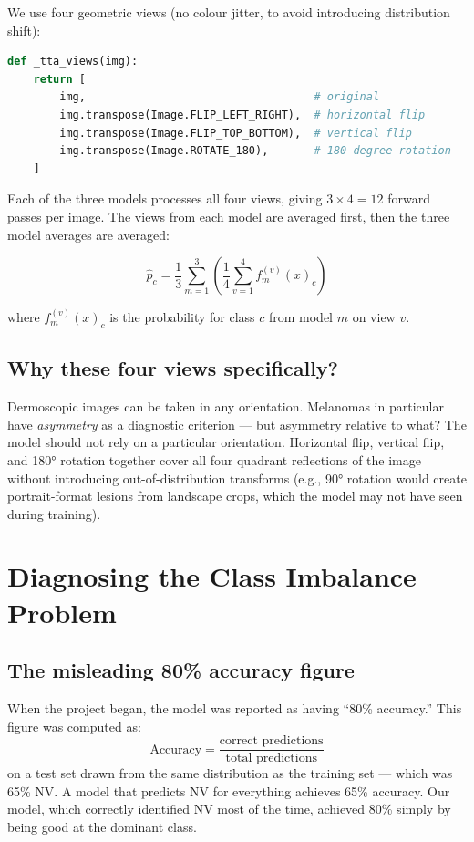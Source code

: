 \documentclass[12pt,a4paper]{article}
\begin{document}
We use four geometric views (no colour jitter, to avoid introducing distribution shift):

\begin{lstlisting}[language=Python]
def _tta_views(img):
    return [
        img,                                   # original
        img.transpose(Image.FLIP_LEFT_RIGHT),  # horizontal flip
        img.transpose(Image.FLIP_TOP_BOTTOM),  # vertical flip
        img.transpose(Image.ROTATE_180),       # 180-degree rotation
    ]
\end{lstlisting}

Each of the three models processes all four views, giving $3 \times 4 = 12$ forward passes
per image. The views from each model are averaged first, then the three model averages are
averaged:

\[
\hat{p}_c = \frac{1}{3} \sum_{m=1}^{3} \left( \frac{1}{4} \sum_{v=1}^{4} f_m^{(v)}(x)_c \right)
\]

where $f_m^{(v)}(x)_c$ is the probability for class $c$ from model $m$ on view $v$.

\subsection{Why these four views specifically?}

Dermoscopic images can be taken in any orientation. Melanomas in particular have \emph{asymmetry}
as a diagnostic criterion --- but asymmetry relative to what? The model should not rely on
a particular orientation. Horizontal flip, vertical flip, and 180° rotation together cover all
four quadrant reflections of the image without introducing out-of-distribution transforms
(e.g., 90° rotation would create portrait-format lesions from landscape crops, which the model
may not have seen during training).

\section{Diagnosing the Class Imbalance Problem}

\subsection{The misleading 80\% accuracy figure}

When the project began, the model was reported as having ``80\% accuracy.'' This figure was
computed as:
\[
\text{Accuracy} = \frac{\text{correct predictions}}{\text{total predictions}}
\]
on a test set drawn from the same distribution as the training set --- which was 65\% NV.
A model that predicts NV for everything achieves 65\% accuracy. Our model, which correctly
identified NV most of the time, achieved 80\% simply by being good at the dominant class.
\end{document}
